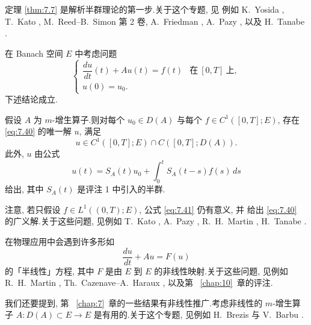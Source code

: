  定理  \ref{thm:7.7} 是解析半群理论的第一步.关于这个专题, 见
例如 K.~Yosida , T.~Kato , M.~Reed--B.~Simon  第 2 卷, A.~Friedman
, A.~Pazy , 以及 H.~Tanabe
.

在 Banach 空间 $E$ 中考虑问题
\begin{equation}
\begin{cases}
\dfrac{du}{dt}(t)+Au(t)=f(t) & \text{在}\ [0,T]\ \text{上},\\
u(0)=u_0.
\end{cases}
\label{eq:7.40}
\end{equation}
下述结论成立.

\begin{theorem}
\label{thm:7.10}
假设 $A$ 为 $m$-增生算子.则对每个 $u_0\in D(A)$ 与每个
$f\in C^1([0,T];E)$, 存在 \eqref{eq:7.40} 的唯一解 $u$, 满足
\begin{equation*}
u\in C^1([0,T];E)\cap C([0,T];D(A)).
\end{equation*}
此外, $u$ 由公式
\begin{equation}
u(t)=S_A(t)u_0+\int_0^tS_A(t-s)f(s)\,ds
\label{eq:7.41}
\end{equation}
给出, 其中 $S_A(t)$ 是评注 1 中引入的半群.
\end{theorem}

注意, 若只假设 $f\in L^1((0,T);E)$, 公式 \eqref{eq:7.41} 仍有意义, 并
给出 \eqref{eq:7.40} 的广义解.关于这些问题, 见例如 T.~Kato
, A.~Pazy , R.~H.~Martin , H.~Tanabe .

在物理应用中会遇到许多形如
\begin{equation*}
\frac{du}{dt}+Au=F(u)
\end{equation*}
的「半线性」方程, 其中 $F$ 是由 $E$ 到 $E$ 的非线性映射.关于这些问题,
见例如 R.~H.~Martin , Th.~Cazenave--A.~Haraux , 以及第~
\ref{chap:10}~章的评注.

我们还要提到, 第~
\ref{chap:7}~章的一些结果有非线性推广.考虑非线性的 $m$-增生算子
$A:D(A)\subset E\to E$ 是有用的.关于这个专题, 见例如 H.~Brezis
 与 V.~Barbu .
